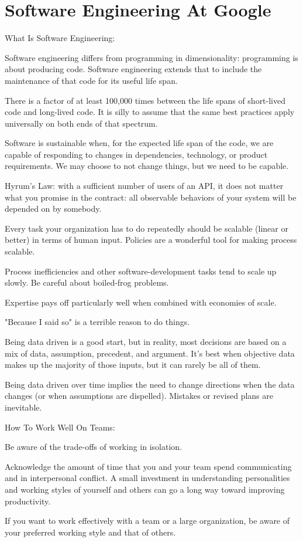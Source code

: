 \chapter{Software Engineering At Google}

What Is Software Engineering:
\bit
\item Software engineering differs from programming in dimensionality: programming is about producing code. Software
engineering extends that to include the maintenance of that code for its useful life span.
\item There is a factor of at least 100,000 times between the life spans of short-lived code and long-lived code. It is
silly to assume that the same best practices apply universally on both ends of that spectrum.
\item Software is sustainable when, for the expected life span of the code, we are capable of responding to changes in
dependencies, technology, or product requirements. We may choose to not change things, but we need to be capable.
\item Hyrum's Law: with a sufficient number of users of an API, it does not matter what you promise in the contract: all
observable behaviors of your system will be depended on by somebody.
\item Every task your organization has to do repeatedly should be scalable (linear or better) in terms of human input.
Policies are a wonderful tool for making process scalable.
\item Process inefficiencies and other software-development tasks tend to scale up slowly. Be careful about boiled-frog
problems.
\item Expertise pays off particularly well when combined with economies of scale.
\item "Because I said so" is a terrible reason to do things.
\item Being data driven is a good start, but in reality, most decisions are based on a mix of data, assumption,
precedent, and argument. It's best when objective data makes up the majority of those inputs, but it can rarely be all
of them.
\item Being data driven over time implies the need to change directions when the data changes (or when assumptions are
dispelled). Mistakes or revised plans are inevitable.
\eit

How To Work Well On Teams:
\bit
\item Be aware of the trade-offs of working in isolation.
\item Acknowledge the amount of time that you and your team spend communicating and in interpersonal conflict. A small
investment in understanding personalities and working styles of yourself and others can go a long way toward improving
productivity.
\item If you want to work effectively with a team or a large organization, be aware of your preferred working style and
that of others.
\eit

